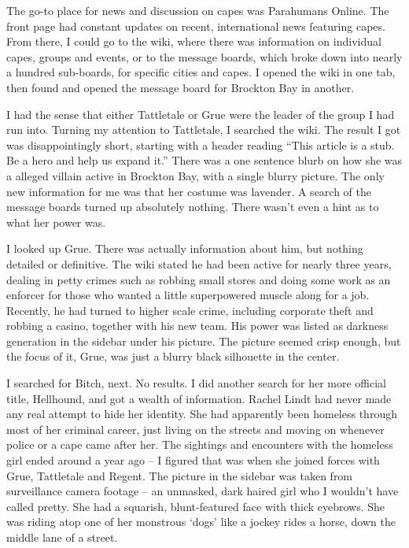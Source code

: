 The go-to place for news and discussion on capes was Parahumans Online.  The front page had constant updates on recent, international news featuring capes.  From there, I could go to the wiki, where there was information on individual capes, groups and events, or to the message boards, which broke down into nearly a hundred sub-boards, for specific cities and capes.  I opened the wiki in one tab, then found and opened the message board for Brockton Bay in another.



I had the sense that either Tattletale or Grue were the leader of the group I had run into.  Turning my attention to Tattletale, I searched the wiki.  The result I got was disappointingly short, starting with a header reading ``This article is a stub.  Be a hero and help us expand it.''  There was a one sentence blurb on how she was a alleged villain active in Brockton Bay, with a single blurry picture.  The only new information for me was that her costume was lavender.  A search of the message boards turned up absolutely nothing.  There wasn't even a hint as to what her power was.



I looked up Grue.  There was actually information about him, but nothing detailed or definitive.  The wiki stated he had been active for nearly three years, dealing in petty crimes such as robbing small stores and doing some work as an enforcer for those who wanted a little superpowered muscle along for a job.  Recently, he had turned to higher scale crime, including corporate theft and robbing a casino, together with his new team.  His power was listed as darkness generation in the sidebar under his picture.  The picture seemed crisp enough, but the focus of it, Grue, was just a blurry black silhouette in the center.



I searched for Bitch, next.  No results.  I did another search for her more official title, Hellhound, and got a wealth of information.  Rachel Lindt had never made any real attempt to hide her identity.  She had apparently been homeless through most of her criminal career, just living on the streets and moving on whenever police or a cape came after her.  The sightings and encounters with the homeless girl ended around a year ago – I figured that was when she joined forces with Grue, Tattletale and Regent.  The picture in the sidebar was taken from surveillance camera footage – an unmasked, dark haired girl who I wouldn't have called pretty.  She had a squarish, blunt-featured face with thick eyebrows.  She was riding atop one of her monstrous `dogs' like a jockey rides a horse, down the middle lane of a street.



